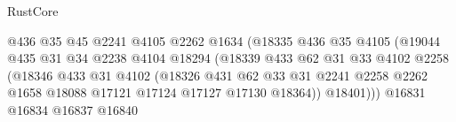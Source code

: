 \begin{lexlean}{RustCore}
\begin{coremodule}
                                          @436
                                          @35
                                          @45
                                          @2241
                                          @4105
                                          @2262
                                          @1634
                                          (@18335
                                            @436
                                            @35
                                            @4105
                                            (@19044
                                              @435
                                              @31
                                              @34
                                              @2238
                                              @4104
                                              @18294
                                              (@18339
                                                @433
                                                @62
                                                @31
                                                @33
                                                @4102
                                                @2258
                                                (@18346
                                                  @433
                                                  @31
                                                  @4102
                                                  (@18326
                                                    @431
                                                    @62
                                                    @33
                                                    @31
                                                    @2241
                                                    @2258
                                                    @2262
                                                    @1658
                                                    @18088
                                                    @17121
                                                    @17124
                                                    @17127
                                                    @17130
                                                    @18364))
                                                @18401)))
                                          @16831
                                          @16834
                                          @16837
                                          @16840

\end{coremodule}
\end{lexlean}
